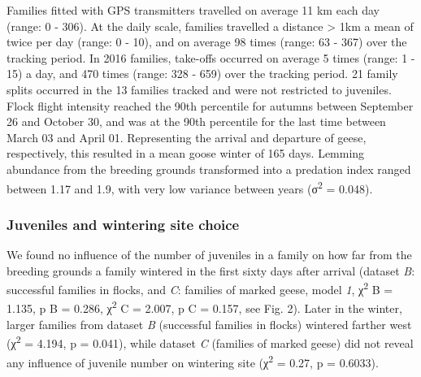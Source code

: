 \documentclass[10pt,twocolumn]{paper}
\begin{document}
Families fitted with GPS transmitters travelled on average 11 km each
day (range: 0 - 306). At the daily scale, families travelled a distance
\textgreater{} 1km a mean of twice per day (range: 0 - 10), and on
average 98 times (range: 63 - 367) over the tracking period. In 2016
families, take-offs occurred on average 5 times (range: 1 - 15) a day,
and 470 times (range: 328 - 659) over the tracking period. 21 family
splits occurred in the 13 families tracked and were not restricted to
juveniles. Flock flight intensity reached the 90th percentile for
autumns between September 26 and October 30, and was at the 90th
percentile for the last time between March 03 and April 01. Representing
the arrival and departure of geese, respectively, this resulted in a
mean goose winter of 165 days. Lemming abundance from the breeding
grounds transformed into a predation index ranged between 1.17 and 1.9,
with very low variance between years (σ\textsuperscript{2} = 0.048).

\subsubsection{Juveniles and wintering site
choice}\label{juveniles-and-wintering-site-choice}

We found no influence of the number of juveniles in a family on how far
from the breeding grounds a family wintered in the first sixty days
after arrival (dataset \emph{B}: successful families in flocks, and
\emph{C}: families of marked geese, model \emph{1}, χ\textsuperscript{2}
B = 1.135, p B = 0.286, χ\textsuperscript{2} C = 2.007, p C = 0.157, see
Fig. 2). Later in the winter, larger families from dataset \emph{B}
(successful families in flocks) wintered farther west
(χ\textsuperscript{2} = 4.194, p = 0.041), while dataset \emph{C}
(families of marked geese) did not reveal any influence of juvenile
number on wintering site (χ\textsuperscript{2} = 0.27, p = 0.6033).
\end{document}
